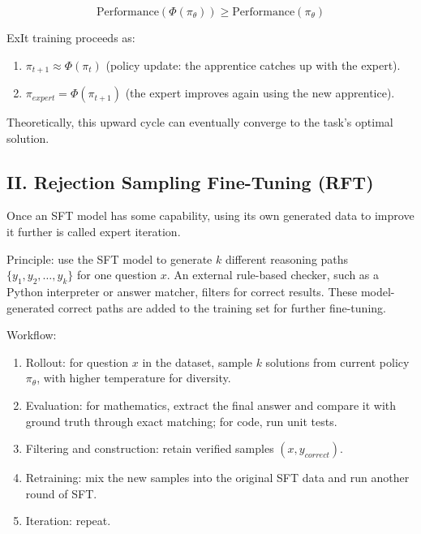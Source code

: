 \[
\mathrm{Performance}(\Phi(\pi_\theta))\ge \mathrm{Performance}(\pi_\theta)
\]

ExIt training proceeds as:

\begin{enumerate}
\def\labelenumi{\arabic{enumi}.}
\tightlist
\item
  \(\pi_{t+1}\approx\Phi(\pi_t)\) (policy update: the apprentice catches up with the expert).
\item
  \(\pi_{expert}=\Phi(\pi_{t+1})\) (the expert improves again using the new apprentice).
\end{enumerate}

Theoretically, this upward cycle can eventually converge to the task's optimal solution.

\hypertarget{ii.-rejection-sampling-fine-tuning-rft}{%
\subsection{II. Rejection Sampling Fine-Tuning (RFT)}\label{ii.-rejection-sampling-fine-tuning-rft}}

Once an SFT model has some capability, using its own generated data to improve it further is called expert iteration.

Principle: use the SFT model to generate \(k\) different reasoning paths \(\{y_1,y_2,\ldots,y_k\}\) for one question \(x\). An external rule-based checker, such as a Python interpreter or answer matcher, filters for correct results. These model-generated correct paths are added to the training set for further fine-tuning.

Workflow:

\begin{enumerate}
\def\labelenumi{\arabic{enumi}.}
\tightlist
\item
  Rollout: for question \(x\) in the dataset, sample \(k\) solutions from current policy \(\pi_\theta\), with higher temperature for diversity.
\item
  Evaluation: for mathematics, extract the final answer and compare it with ground truth through exact matching; for code, run unit tests.
\item
  Filtering and construction: retain verified samples \((x,y_{correct})\).
\item
  Retraining: mix the new samples into the original SFT data and run another round of SFT.
\item
  Iteration: repeat.
\end{enumerate}

